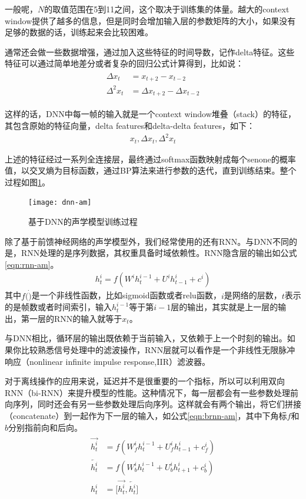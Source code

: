 一般呢，$N$的取值范围在5到11之间，这个取决于训练集的体量。越大的context window提供了越多的信息，但是同时会增加输入层的参数矩阵的大小，如果没有足够的数据的话，训练起来会比较困难。

通常还会做一些数据增强，通过加入这些特征的时间导数，记作delta特征。这些特征可以通过简单地差分或者复杂的回归公式计算得到，比如说：
\begin{align}
\begin{split}
\Delta x_{t} &= x_{t+2} - x_{t-2} \\
\Delta^{2} x_{t} &= \Delta x_{t+2} - \Delta x_{t-2} 
\end{split}
\end{align}

这样的话，DNN中每一帧的输入就是一个context window堆叠（stack）的特征，其包含原始的特征向量，delta features和delta-delta features，如下：
\begin{align} 
  x_{t} , \Delta x_{t}, \Delta^{2} x_{t} 
\end{align}

上述的特征经过一系列全连接层，最终通过softmax函数映射成每个senone的概率值，以交叉熵为目标函数，通过BP算法来进行参数的迭代，直到训练结束。整个过程如图\ref{fig:dnn-am}。
\begin{figure}[htbp]
  \centering
  \texttt{[image: dnn-am]}
  \caption{基于DNN的声学模型训练过程\label{fig:dnn-am}}
\end{figure}

除了基于前馈神经网络的声学模型外，我们经常使用的还有RNN。与DNN不同的是，RNN处理的是序列数据，其权重具备时域依赖性。RNN隐含层的输出如公式\ref{eqn:rnn-am}。
\begin{align} 
\label{eqn:rnn-am}
  h_{t}^{i} = f(W^{i}h_{t}^{i-1} + U^{i}h_{t-1}^{i}+c^{i})
\end{align}
其中$f(\dot)$是一个非线性函数，比如sigmoid函数或者relu函数，$i$是网络的层数，$t$表示的是帧数或者时间索引，输入$h_{t}^{i-1}$等于第$i-1$层的输出，其实就是上一层的输出，第一层的RNN的输入就等于$x_{t}$。

与DNN相比，循环层的输出既依赖于当前输入，又依赖于上一个时刻的输出。如果你比较熟悉信号处理中的滤波操作，RNN层就可以看作是一个非线性无限脉冲响应（nonlinear infinite impulse response,IIR）滤波器。

对于离线操作的应用来说，延迟并不是很重要的一个指标，所以可以利用双向RNN（bi-RNN）来提升模型的性能。这种情况下，每一层都会有一些参数处理前向序列，同时还会有另一些参数处理后向序列。这样就会有两个输出，将它们拼接（concatenate）到一起作为下一层的输入，如公式\ref{eqn:brnn-am}，其中下角标$f$和$b$分别指前向和后向。
\begin{align}
\label{eqn:brnn-am}
\begin{split}
 \overrightarrow{h_{t}^{i}} &= f(W_{f}^{i}h_{t}^{i-1} + U_{f}^{i}h_{t-1}^{i}+c_{f}^{i}) \\
 \overleftarrow{h_{t}^{i}} &= f(W_{b}^{i}h_{t}^{i-1} + U_{b}^{i}h_{t+1}^{i}+c_{b}^{i}) \\
 h_{t}^{i} &= \Big[\overrightarrow{h_{t}^{i}} , \overleftarrow{h_{t}^{i}} \Big]
\end{split}
\end{align}

